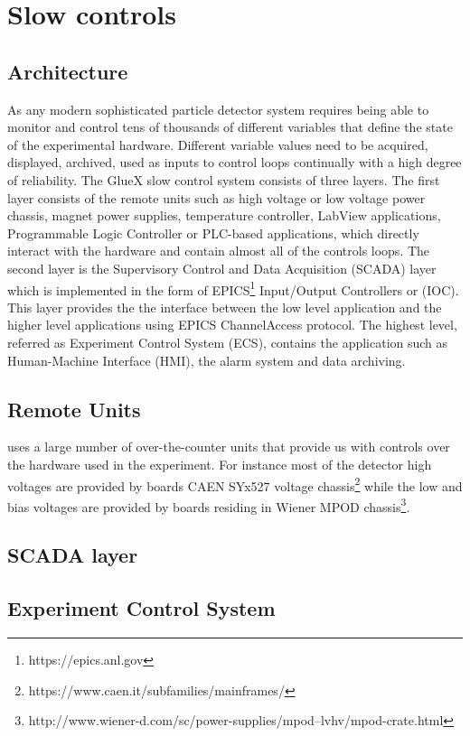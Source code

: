 
\section[Slow controls (Hovanes)]{Slow controls \label{sec:controls}}
\subsection{Architecture \label{sec:controlsarchitechture}}
As any modern sophisticated particle detector system \gx{} requires being able to monitor 
and control tens of thousands of different variables that define the state of the experimental hardware. Different variable values need to be acquired, displayed, archived, used as inputs to control loops continually with a high degree of reliability. The GlueX slow control system consists of three layers. The first layer consists of the remote units such as high voltage or low voltage power chassis, magnet power supplies, temperature controller, LabView applications, Programmable Logic Controller or PLC-based applications, which directly interact with the hardware and contain almost all of the controls loops. The second layer is the Supervisory Control and Data Acquisition (SCADA) layer which is implemented in the form of EPICS\footnote{https://epics.anl.gov} Input/Output Controllers or (IOC). This layer provides the the interface between the low level application and the higher level applications using EPICS ChannelAccess protocol. The highest level, referred as Experiment Control System (ECS), contains the application such as Human-Machine Interface (HMI), the alarm system and data archiving. 

\subsection{Remote Units \label{sec:controlsinterface}}
\gx{} uses a large number of over-the-counter units that provide us with controls over the hardware used in the experiment. For instance most of the detector high voltages are provided by boards CAEN SYx527 voltage chassis\footnote{https://www.caen.it/subfamilies/mainframes/} while the low and bias voltages are provided by boards residing in Wiener MPOD chassis\footnote{http://www.wiener-d.com/sc/power-supplies/mpod--lvhv/mpod-crate.html}. 
\subsection{SCADA layer \label{sec:archiver}}
\subsection{Experiment Control System \label{sec:alarms}}
